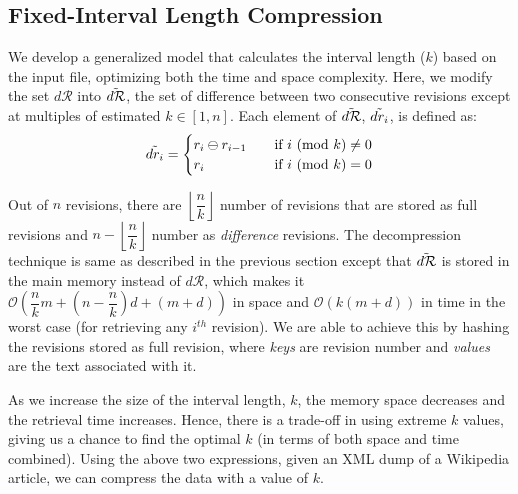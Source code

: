 \documentclass[acmsmall]{acmart}
\newcommand{\Mod}[1]{\ (\mathrm{mod}\ #1)}
\begin{document}
\subsection{Fixed-Interval Length Compression}
We develop a generalized model that calculates the interval length ($k$) based on the input file, optimizing both the time and space complexity. Here, we modify the set $d\mathcal{R}$ into $\Tilde{d\mathcal{R}}$, the set of difference between two consecutive revisions except at multiples of estimated $k \in [1, n]$. Each element of $\Tilde{d\mathcal{R}}$, $\Tilde{dr_i}$, is defined as:
\begin{equation*}
    \Tilde{dr_i} = 
    \begin{cases}
    r_{i} \ominus r_{i-1} &\quad \text{if $i \Mod{k} \neq 0$}\\
    r_{i} &\quad \text{if $i \Mod{k} = 0$}
    \end{cases}
\end{equation*}

Out of $n$ revisions, there are $\left\lfloor \dfrac{n}{k} \right\rfloor$ number of revisions that are stored as full revisions and $n-\left\lfloor \dfrac{n}{k} \right\rfloor$ number as \emph{difference} revisions. The decompression technique is same as described in the previous section except that $\Tilde{d\mathcal{R}}$ is stored in the main memory instead of $d\mathcal{R}$, which makes it $\mathcal{O}\left(\dfrac{n}{k}m + \left(n-\dfrac{n}{k}\right)d + (m+d)\right)$ in space and $\mathcal{O}(k(m+d))$ in time in the worst case (for retrieving any $i^{th}$ revision). We are able to achieve this by hashing the revisions stored as full revision, where \emph{keys} are revision number and \emph{values} are the text associated with it.

As we increase the size of the interval length, $k$, the memory space decreases and the retrieval time increases. Hence, there is a trade-off in using extreme $k$ values, giving us a chance to find the optimal $k$ (in terms of both space and time combined). Using the above two expressions, given an XML dump of a Wikipedia article, we can compress the data with a value of $k$.

\end{document}
